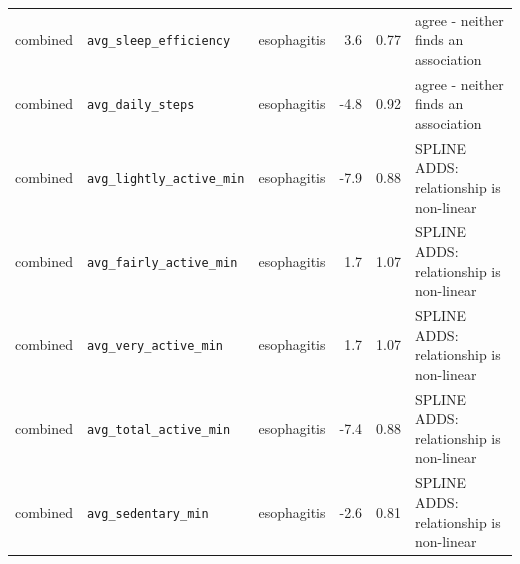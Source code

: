 \documentclass[11pt]{article}
\newcommand{\code}[1]{\texttt{\small #1}}
\begin{document}
\begin{longtable}{@{}p{2.0cm}p{3.4cm}p{2.4cm}rr p{3.2cm}@{}}
combined & \code{avg\_sleep\_efficiency} & esophagitis & 3.6 & 0.77 & agree - neither finds an association \\
combined & \code{avg\_daily\_steps} & esophagitis & -4.8 & 0.92 & agree - neither finds an association \\
combined & \code{avg\_lightly\_active\_min} & esophagitis & -7.9 & 0.88 & SPLINE ADDS: relationship is non-linear \\
combined & \code{avg\_fairly\_active\_min} & esophagitis & 1.7 & 1.07 & SPLINE ADDS: relationship is non-linear \\
combined & \code{avg\_very\_active\_min} & esophagitis & 1.7 & 1.07 & SPLINE ADDS: relationship is non-linear \\
combined & \code{avg\_total\_active\_min} & esophagitis & -7.4 & 0.88 & SPLINE ADDS: relationship is non-linear \\
combined & \code{avg\_sedentary\_min} & esophagitis & -2.6 & 0.81 & SPLINE ADDS: relationship is non-linear \\
\bottomrule \end{longtable}\normalsize
\end{document}
